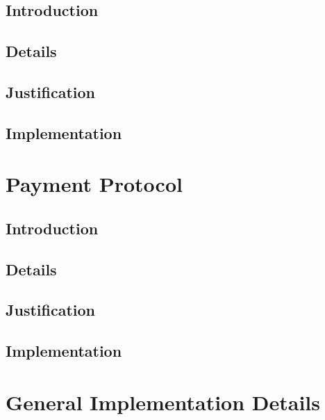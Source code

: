 \documentclass[a4paper,11pt]{article}
\begin{document}
\subsection{Introduction}

\subsection{Details}

\subsection{Justification}

\subsection{Implementation}

\section{Payment Protocol}

\subsection{Introduction}

\subsection{Details}

\subsection{Justification}

\subsection{Implementation}

\section{General Implementation Details}
\end{document}
